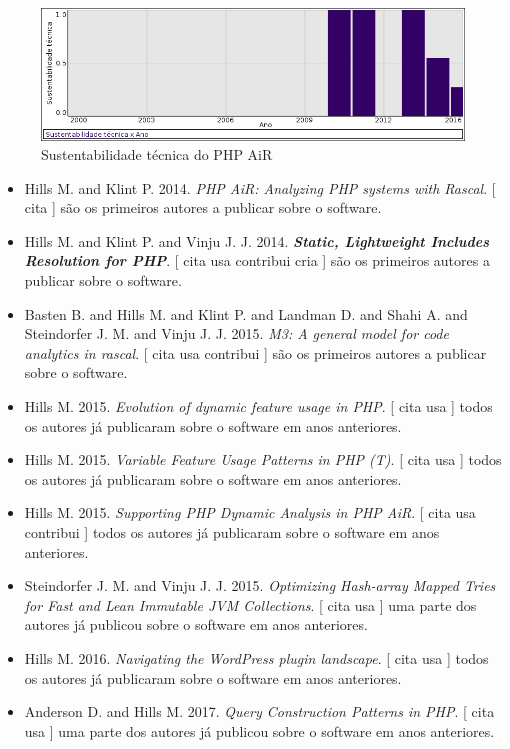 \begin{figure}[h]
  \center
  \includegraphics[scale=0.50]{result-documents/charts/php-air.png}
  \caption{Sustentabilidade técnica do PHP AiR}
\end{figure}


\begin{itemize}
\item Hills M. and Klint P.
      2014.
        \textit{ PHP AiR: Analyzing PHP systems with Rascal}.
      [
          cita
      ]
são os primeiros autores a publicar sobre o software.
\item Hills M. and Klint P. and Vinju J. J.
      2014.
        \textbf{\textit{ Static, Lightweight Includes Resolution for PHP}}.
      [
          cita
          usa
          contribui
          cria
      ]
são os primeiros autores a publicar sobre o software.
\item Basten B. and Hills M. and Klint P. and Landman D. and Shahi A. and Steindorfer J. M. and Vinju J. J.
      2015.
        \textit{ M3: A general model for code analytics in rascal}.
      [
          cita
          usa
          contribui
      ]
são os primeiros autores a publicar sobre o software.
\item Hills M.
      2015.
        \textit{ Evolution of dynamic feature usage in PHP}.
      [
          cita
          usa
      ]
todos os autores já publicaram sobre o software em anos anteriores.
\item Hills M.
      2015.
        \textit{ Variable Feature Usage Patterns in PHP (T)}.
      [
          cita
          usa
      ]
todos os autores já publicaram sobre o software em anos anteriores.
\item Hills M.
      2015.
        \textit{ Supporting PHP Dynamic Analysis in PHP AiR}.
      [
          cita
          usa
          contribui
      ]
todos os autores já publicaram sobre o software em anos anteriores.
\item Steindorfer J. M. and Vinju J. J.
      2015.
        \textit{ Optimizing Hash-array Mapped Tries for Fast and Lean Immutable JVM Collections}.
      [
          cita
          usa
      ]
uma parte dos autores já publicou sobre o software em anos anteriores.
\item Hills M.
      2016.
        \textit{ Navigating the WordPress plugin landscape}.
      [
          cita
          usa
      ]
todos os autores já publicaram sobre o software em anos anteriores.
\item Anderson D. and Hills M.
      2017.
        \textit{ Query Construction Patterns in PHP}.
      [
          cita
          usa
      ]
uma parte dos autores já publicou sobre o software em anos anteriores.
\end{itemize}
